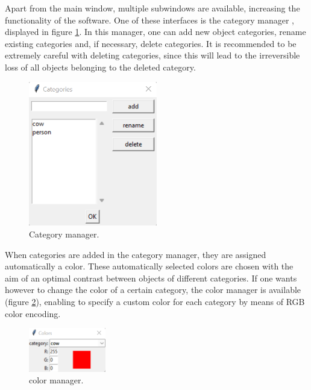 \documentclass[a4paper, 11pt]{article}
\begin{document}
Apart from the main window, multiple subwindows are available, increasing the functionality of the software. One of these interfaces is the category manager , displayed in figure \ref{fig:category manager}. In this manager, one can add new object categories, rename existing categories and, if necessary, delete categories. It is recommended to be extremely careful with deleting categories, since this will lead to the irreversible loss of all objects belonging to the deleted category.

\begin{figure}[h!]
	\centering
	\includegraphics[width=0.5\textwidth]{category_manager}
	\captionsetup{width=0.5\textwidth}
	\caption{Category manager.}
	\label{fig:category manager}
\end{figure}

When categories are added in the category manager, they are assigned automatically a color. These automatically selected colors are chosen with the aim of an optimal contrast between objects of different categories. If one wants however to change the color of a certain category, the color manager is available (figure \ref{fig:color manager}), enabling to specify a custom color for each category by means of RGB color encoding.

\begin{figure}[h!]
	\centering
	\includegraphics[width=0.3\textwidth]{color_manager}
	\captionsetup{width=0.3\textwidth}
	\caption{color manager.}
	\label{fig:color manager}
\end{figure}
\end{document}
